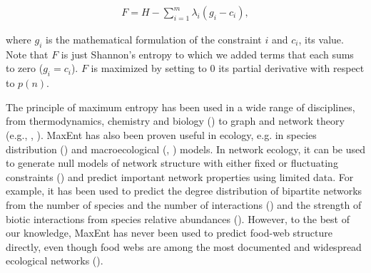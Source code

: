 \begin{eqnarray}
  \label{eq:F}
          F = H - \sum_{i=1}^m \lambda_i (g_i-c_i),
\end{eqnarray}
  
where $g_i$ is the mathematical formulation of the constraint $i$ and $c_i$,
its value. Note that $F$ is just Shannon's entropy to which we added terms
that each sums to zero ($g_i = c_i$). $F$ is maximized by setting to $0$ its
partial derivative with respect to $p(n)$. 

The principle of maximum entropy has been used in a wide range of disciplines,
from thermodynamics, chemistry and biology (\cite{Martyushev2006Maximum}) to
graph and network theory (e.g., \cite{Park2004Statistical},
\cite{vanderHoorn2018Sparse}). MaxEnt has also been proven useful in ecology,
e.g. in species distribution (\cite{Phillips2006Maximum}) and macroecological
(\cite{Harte2008Maximum}, \cite{Harte2014Maximum}) models. In network ecology,
it can be used to generate null models of network structure with either fixed or
fluctuating constraints (\cite{Caruso2022Fluctuating}) and predict important
network properties using limited data. For example, it has been used to predict
the degree distribution of bipartite networks from the number of species and the
number of interactions (\cite{Williams2011Biology}) and the strength of biotic
interactions from species relative abundances (\cite{Stock2021Optimal}).
However, to the best of our knowledge, MaxEnt has never been used to predict
food-web structure directly, even though food webs are among the most documented
and widespread ecological networks (\cite{Ings2009Review}).

